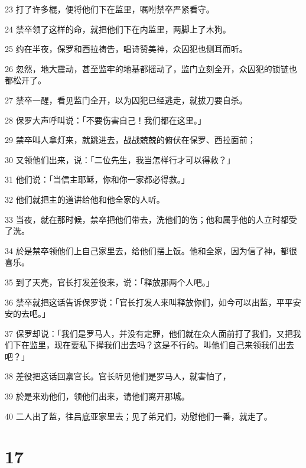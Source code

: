 \par 23 打了许多棍，便将他们下在监里，嘱咐禁卒严紧看守。
\par 24 禁卒领了这样的命，就把他们下在内监里，两脚上了木狗。
\par 25 约在半夜，保罗和西拉祷告，唱诗赞美神，众囚犯也侧耳而听。
\par 26 忽然，地大震动，甚至监牢的地基都摇动了，监门立刻全开，众囚犯的锁链也都松开了。
\par 27 禁卒一醒，看见监门全开，以为囚犯已经逃走，就拔刀要自杀。
\par 28 保罗大声呼叫说：「不要伤害自己！我们都在这里。」
\par 29 禁卒叫人拿灯来，就跳进去，战战兢兢的俯伏在保罗、西拉面前；
\par 30 又领他们出来，说：「二位先生，我当怎样行才可以得救？」
\par 31 他们说：「当信主耶稣，你和你一家都必得救。」
\par 32 他们就把主的道讲给他和他全家的人听。
\par 33 当夜，就在那时候，禁卒把他们带去，洗他们的伤；他和属乎他的人立时都受了洗。
\par 34 於是禁卒领他们上自己家里去，给他们摆上饭。他和全家，因为信了神，都很喜乐。
\par 35 到了天亮，官长打发差役来，说：「释放那两个人吧。」
\par 36 禁卒就把这话告诉保罗说：「官长打发人来叫释放你们，如今可以出监，平平安安的去吧。」
\par 37 保罗却说：「我们是罗马人，并没有定罪，他们就在众人面前打了我们，又把我们下在监里，现在要私下撵我们出去吗？这是不行的。叫他们自己来领我们出去吧？」
\par 38 差役把这话回禀官长。官长听见他们是罗马人，就害怕了，
\par 39 於是来劝他们，领他们出来，请他们离开那城。
\par 40 二人出了监，往吕底亚家里去；见了弟兄们，劝慰他们一番，就走了。

\chapter{17}


